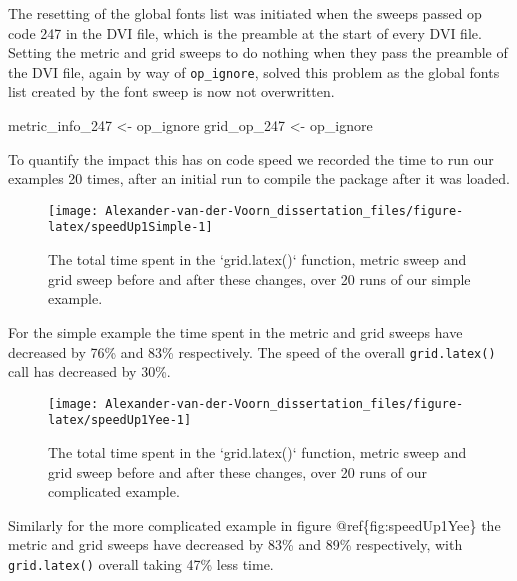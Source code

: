 \documentclass[]{article}
\newenvironment{Shaded}{\begin{snugshade}}{\end{snugshade}}
\newcommand{\DecValTok}[1]{\textcolor[rgb]{0.00,0.00,0.81}{#1}}
\newcommand{\StringTok}[1]{\textcolor[rgb]{0.31,0.60,0.02}{#1}}
\newcommand{\NormalTok}[1]{#1}
\begin{document}
The resetting of the global fonts list was initiated when the sweeps
passed op code 247 in the DVI file, which is the preamble at the start
of every DVI file. Setting the metric and grid sweeps to do nothing when
they pass the preamble of the DVI file, again by way of
\texttt{op\_ignore}, solved this problem as the global fonts list
created by the font sweep is now not overwritten.

\begin{Shaded}
\begin{Highlighting}[]
\NormalTok{metric_info_}\DecValTok{247}\NormalTok{ <-}\StringTok{ }\NormalTok{op_ignore}
\NormalTok{grid_op_}\DecValTok{247}\NormalTok{ <-}\StringTok{ }\NormalTok{op_ignore}
\end{Highlighting}
\end{Shaded}

To quantify the impact this has on code speed we recorded the time to
run our examples 20 times, after an initial run to compile the package
after it was loaded.

\begin{figure}

{\centering \texttt{[image: Alexander-van-der-Voorn\_dissertation\_files/figure-latex/speedUp1Simple-1]} 

}

\caption{The total time spent in the `grid.latex()` function, metric sweep and grid sweep before and after these changes, over 20 runs of our simple example.}\label{fig:speedUp1Simple}
\end{figure}

For the simple example the time spent in the metric and grid sweeps have
decreased by 76\% and 83\% respectively. The speed of the overall
\texttt{grid.latex()} call has decreased by 30\%.

\begin{figure}

{\centering \texttt{[image: Alexander-van-der-Voorn\_dissertation\_files/figure-latex/speedUp1Yee-1]} 

}

\caption{The total time spent in the `grid.latex()` function, metric sweep and grid sweep before and after these changes, over 20 runs of our complicated example.}\label{fig:speedUp1Yee}
\end{figure}

Similarly for the more complicated example in figure
@ref\{fig:speedUp1Yee\} the metric and grid sweeps have decreased by
83\% and 89\% respectively, with \texttt{grid.latex()} overall taking
47\% less time.
\end{document}
